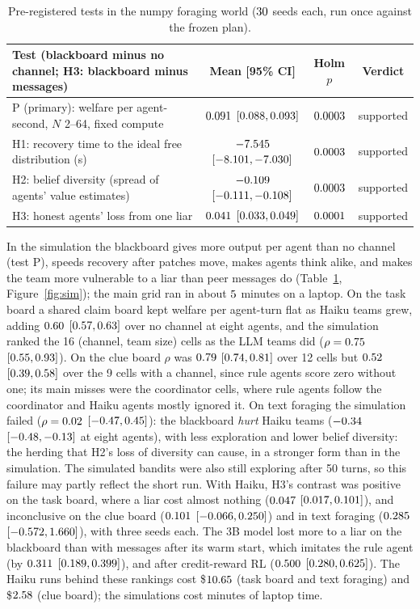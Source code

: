 \documentclass{article}
\begin{document}
\begin{table}[h]
\centering
\small
\begin{tabular}{@{}>{\raggedright\arraybackslash}p{6.1cm}ccc@{}}
\toprule
Test (blackboard minus no channel; H3: blackboard minus messages) & Mean [95\% CI] & Holm $p$ & Verdict \\
\midrule
P (primary): welfare per agent-second, $N$ 2--64, fixed compute & $0.091$ $[0.088, 0.093]$ & $0.0003$ & supported \\
H1: recovery time to the ideal free distribution (s) & $-7.545$ $[-8.101, -7.030]$ & $0.0003$ & supported \\
H2: belief diversity (spread of agents' value estimates) & $-0.109$ $[-0.111, -0.108]$ & $0.0003$ & supported \\
H3: honest agents' loss from one liar & $0.041$ $[0.033, 0.049]$ & $0.0001$ & supported \\
\bottomrule
\end{tabular}
\caption{Pre-registered tests in the numpy foraging world ($30$ seeds each, run once against the frozen plan).}
\label{tab:tests}
\end{table}

In the simulation the blackboard gives more output per agent than no channel (test P), speeds recovery after patches move, makes agents think alike, and makes the team more vulnerable to a liar than peer messages do (Table~\ref{tab:tests}, Figure~\ref{fig:sim}); the main grid ran in about $5$ minutes on a laptop. On the task board a shared claim board kept welfare per agent-turn flat as Haiku teams grew, adding $0.60$ $[0.57, 0.63]$ over no channel at eight agents, and the simulation ranked the 16 (channel, team size) cells as the LLM teams did ($\rho = 0.75$ $[0.55, 0.93]$). On the clue board $\rho$ was $0.79$ $[0.74, 0.81]$ over 12 cells but $0.52$ $[0.39, 0.58]$ over the 9 cells with a channel, since rule agents score zero without one; its main misses were the coordinator cells, where rule agents follow the coordinator and Haiku agents mostly ignored it. On text foraging the simulation failed ($\rho = 0.02$ $[-0.47, 0.45]$): the blackboard \emph{hurt} Haiku teams ($-0.34$ $[-0.48, -0.13]$ at eight agents), with less exploration and lower belief diversity: the herding \citep{bikhchandani1992cascades} that H2's loss of diversity can cause, in a stronger form than in the simulation. The simulated bandits were also still exploring after 50 turns, so this failure may partly reflect the short run. With Haiku, H3's contrast was positive on the task board, where a liar cost almost nothing ($0.047$ $[0.017, 0.101]$), and inconclusive on the clue board ($0.101$ $[-0.066, 0.250]$) and in text foraging ($0.285$ $[-0.572, 1.660]$), with three seeds each. The 3B model lost more to a liar on the blackboard than with messages after its warm start, which imitates the rule agent (by $0.311$ $[0.189, 0.399]$), and after credit-reward RL ($0.500$ $[0.280, 0.625]$). The Haiku runs behind these rankings cost \$$10.65$ (task board and text foraging) and \$$2.58$ (clue board); the simulations cost minutes of laptop time.
\end{document}
